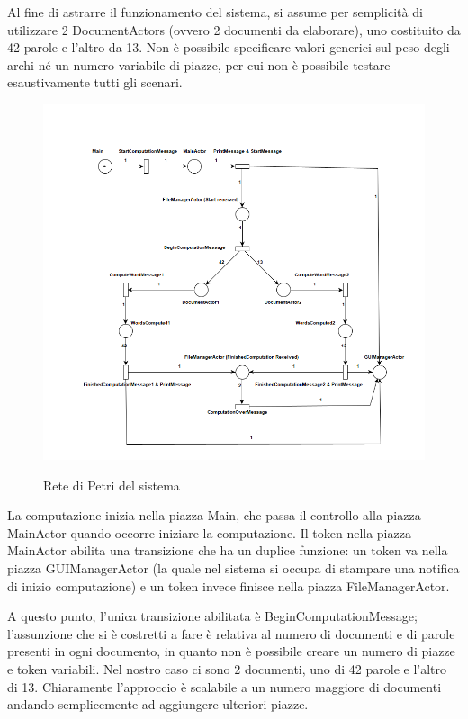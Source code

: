 \begin{warn}[NOTA:]
Al fine di astrarre il funzionamento del sistema, si assume per semplicità di utilizzare 2 DocumentActors (ovvero 2 documenti da elaborare), uno costituito da 42 parole e l'altro da 13. Non è possibile specificare valori generici sul peso degli archi né un numero variabile di piazze, per cui non è possibile testare esaustivamente tutti gli scenari.
\end{warn}

\begin{figure}[H]
	\begin{center}
		\includegraphics[width=\linewidth]{img/part-1/petri_net_actors.png}
		\label{fig:actors-petri-net}
	\end{center}
	\caption{Rete di Petri del sistema}
\end{figure}

\noindent La computazione inizia nella piazza Main, che passa il controllo alla piazza MainActor quando occorre iniziare la computazione. Il token nella piazza MainActor abilita una transizione che ha un duplice funzione: un token va nella piazza GUIManagerActor (la quale nel sistema si occupa di stampare una notifica di inizio computazione) e un token invece finisce nella piazza FileManagerActor.\newline

\noindent A questo punto, l'unica transizione abilitata è BeginComputationMessage; l'assunzione che si è costretti a fare è relativa al numero di documenti e di parole presenti in ogni documento, in quanto non è possibile creare un numero di piazze e token variabili. Nel nostro caso ci sono 2 documenti, uno di 42 parole e l'altro di 13. Chiaramente l'approccio è scalabile a un numero maggiore di documenti andando semplicemente ad aggiungere ulteriori piazze.\newline


